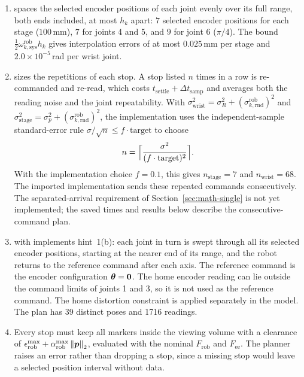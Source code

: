 \documentclass[../main.tex]{subfiles}
\begin{document}
\begin{enumerate}
\renewcommand{\labelenumi}{\roman{enumi}.}
\item {} spaces the selected encoder positions of each joint evenly over its full range, both ends included, at most $h_k$ apart: $7$ selected encoder positions for each stage ($100$\,mm), $7$ for joints 4 and 5, and $9$ for joint 6 ($\pi/4$). The bound $\tfrac12\omega^{\mathrm{rob}}_{k,\mathrm{sys}}h_k$ gives interpolation errors of at most $0.025$\,mm per stage and $2.0\times10^{-5}$\,rad per wrist joint.
\item {} sizes the repetitions of each stop. A stop listed $n$ times in a row is re-commanded and re-read, which costs $t_{\mathrm{settle}}+\Delta t_{\mathrm{samp}}$ and averages both the reading noise and the joint repeatability. With $\sigma^2_{\mathrm{wrist}}=\sigma_R^2+(\sigma^{\mathrm{rob}}_{k,\mathrm{rnd}})^2$ and $\sigma^2_{\mathrm{stage}}=\sigma_p^2+(\sigma^{\mathrm{rob}}_{k,\mathrm{rnd}})^2$, the implementation uses the independent-sample standard-error rule $\sigma/\sqrt n\leq f\cdot\mathrm{target}$ to choose
\begin{equation}\label{eq:alg-reps}
n=\Bigl\lceil\frac{\sigma^2}{(f\cdot\mathrm{target})^2}\Bigr\rceil .
\end{equation}
With the implementation choice $f=0.1$, this gives $n_{\mathrm{stage}}=7$ and $n_{\mathrm{wrist}}=68$. The imported implementation sends these repeated commands consecutively. The separated-arrival requirement of Section~\ref{sec:math-single} is not yet implemented; the saved times and results below describe the consecutive-command plan.
\item {} with  implements hint~1(b): each joint in turn is swept through all its selected encoder positions, starting at the nearer end of its range, and the robot returns to the reference command after each axis. The reference command is the encoder configuration $\bm{\theta}=\bm{0}$. The home encoder reading can lie outside the command limits of joints 1 and 3, so it is not used as the reference command. The home distortion constraint is applied separately in the model. The plan has 39 distinct poses and 1716 readings.
\item Every stop must keep all markers inside the viewing volume with a clearance of $\epsilon^{\max}_{\mathrm{rob}}+\alpha^{\max}_{\mathrm{rob}}\left\|\bm{p}\right\|_2$, evaluated with the nominal $F_{\mathrm{rob}}$ and $F_{\mathrm{ee}}$. The planner raises an error rather than dropping a stop, since a missing stop would leave a selected position interval without data.

\end{enumerate}
\end{document}
